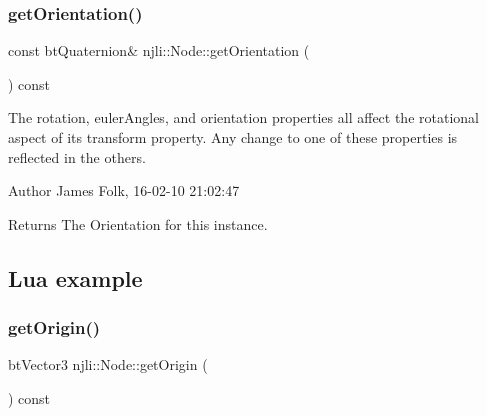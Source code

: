 \begin{DoxyCodeInclude}
\end{DoxyCodeInclude}
\mbox{\label{classnjli_1_1_node_ac0add98eca113cca1ece6bfc42bd2ad0}} 
\subsubsection{\texorpdfstring{get\+Orientation()}{getOrientation()}}
{\footnotesize\ttfamily const bt\+Quaternion\& njli\+::\+Node\+::get\+Orientation (\begin{DoxyParamCaption}{ }\end{DoxyParamCaption}) const}



The rotation, euler\+Angles, and orientation properties all affect the rotational aspect of its transform property. Any change to one of these properties is reflected in the others. 

\begin{DoxyAuthor}{Author}
James Folk, 16-\/02-\/10 21\+:02\+:47
\end{DoxyAuthor}
\begin{DoxyReturn}{Returns}
The Orientation for this instance.
\end{DoxyReturn}
\hypertarget{classnjli_1_1_steering_behavior_wander_ex1}{}\subsection{Lua example}\label{classnjli_1_1_steering_behavior_wander_ex1}

\begin{DoxyCodeInclude}
\end{DoxyCodeInclude}
\mbox{\label{classnjli_1_1_node_a3258ee7eeedc10261985f5d5eb4e765d}} 
\subsubsection{\texorpdfstring{get\+Origin()}{getOrigin()}}
{\footnotesize\ttfamily bt\+Vector3 njli\+::\+Node\+::get\+Origin (\begin{DoxyParamCaption}{ }\end{DoxyParamCaption}) const}



